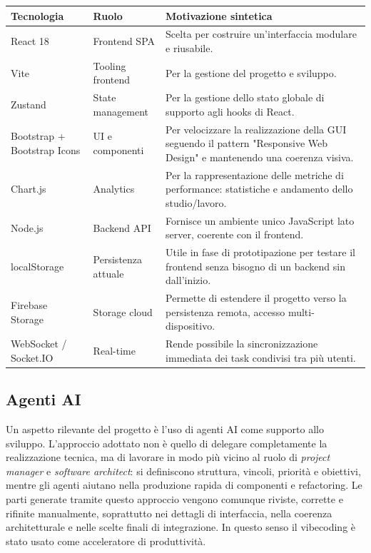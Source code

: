 \documentclass[12pt,a4paper]{article}
\begin{document}
\begin{table}[h]
    \centering
    \begin{tabular}{>{\raggedright\arraybackslash}p{3.2cm} >{\raggedright\arraybackslash}p{4.1cm} >{\raggedright\arraybackslash}p{6.1cm}}
        \toprule
        \textbf{Tecnologia} & \textbf{Ruolo} & \textbf{Motivazione sintetica} \\
        \midrule
        React 18 & Frontend SPA & Scelta per costruire un'interfaccia modulare e riusabile. \\
        Vite & Tooling frontend & Per la gestione del progetto e sviluppo. \\
        Zustand & State management & Per la gestione dello stato globale di supporto agli hooks di React. \\
        Bootstrap + Bootstrap Icons & UI e componenti & Per velocizzare la realizzazione della GUI seguendo il pattern "Responsive Web Design" e mantenendo una coerenza visiva. \\
        Chart.js & Analytics & Per la rappresentazione delle metriche di performance: statistiche e andamento dello studio/lavoro. \\
        Node.js & Backend API & Fornisce un ambiente unico JavaScript lato server, coerente con il frontend. \\
        localStorage & Persistenza attuale & Utile in fase di prototipazione per testare il frontend senza bisogno di un backend sin dall'inizio. \\
        Firebase Storage & Storage cloud  & Permette di estendere il progetto verso la persistenza remota, accesso multi-dispositivo. \\
        WebSocket / Socket.IO & Real-time & Rende possibile la sincronizzazione immediata dei task condivisi tra più utenti. \\
        \bottomrule
    \end{tabular}
\end{table}

\subsection*{Agenti AI}
Un aspetto rilevante del progetto \`e l'uso di agenti AI come supporto allo sviluppo. L'approccio adottato non \`e quello di delegare completamente la realizzazione tecnica, ma di lavorare in modo pi\`u vicino al ruolo di \textit{project manager} e \textit{software architect}: si definiscono struttura, vincoli, priorit\`a e obiettivi, mentre gli agenti aiutano nella produzione rapida di componenti e refactoring.
Le parti generate tramite questo approccio vengono comunque riviste, corrette e rifinite manualmente, soprattutto nei dettagli di interfaccia, nella coerenza architetturale e nelle scelte finali di integrazione. In questo senso il vibecoding \`e stato usato come acceleratore di produttivit\`a.
\end{document}
